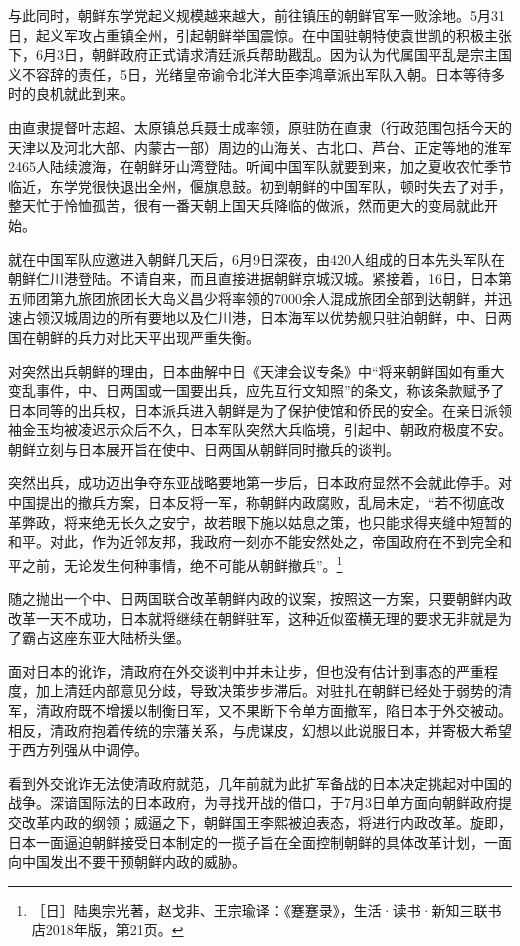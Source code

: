 \documentclass[12pt,UTF8]{ctexbook}
\begin{document}
与此同时，朝鲜东学党起义规模越来越大，前往镇压的朝鲜官军一败涂地。5月31日，起义军攻占重镇全州，引起朝鲜举国震惊。在中国驻朝特使袁世凯的积极主张下，6月3日，朝鲜政府正式请求清廷派兵帮助戡乱。因为认为代属国平乱是宗主国义不容辞的责任，5日，光绪皇帝谕令北洋大臣李鸿章派出军队入朝。日本等待多时的良机就此到来。

由直隶提督叶志超、太原镇总兵聂士成率领，原驻防在直隶（行政范围包括今天的天津以及河北大部、内蒙古一部）周边的山海关、古北口、芦台、正定等地的淮军2465人陆续渡海，在朝鲜牙山湾登陆。听闻中国军队就要到来，加之夏收农忙季节临近，东学党很快退出全州，偃旗息鼓。初到朝鲜的中国军队，顿时失去了对手，整天忙于怜恤孤苦，很有一番天朝上国天兵降临的做派，然而更大的变局就此开始。

就在中国军队应邀进入朝鲜几天后，6月9日深夜，由420人组成的日本先头军队在朝鲜仁川港登陆。不请自来，而且直接进据朝鲜京城汉城。紧接着，16日，日本第五师团第九旅团旅团长大岛义昌少将率领的7000余人混成旅团全部到达朝鲜，并迅速占领汉城周边的所有要地以及仁川港，日本海军以优势舰只驻泊朝鲜，中、日两国在朝鲜的兵力对比天平出现严重失衡。

对突然出兵朝鲜的理由，日本曲解中日《天津会议专条》中“将来朝鲜国如有重大变乱事件，中、日两国或一国要出兵，应先互行文知照”的条文，称该条款赋予了日本同等的出兵权，日本派兵进入朝鲜是为了保护使馆和侨民的安全。在亲日派领袖金玉均被凌迟示众后不久，日本军队突然大兵临境，引起中、朝政府极度不安。朝鲜立刻与日本展开旨在使中、日两国从朝鲜同时撤兵的谈判。

突然出兵，成功迈出争夺东亚战略要地第一步后，日本政府显然不会就此停手。对中国提出的撤兵方案，日本反将一军，称朝鲜内政腐败，乱局未定，“若不彻底改革弊政，将来绝无长久之安宁，故若眼下施以姑息之策，也只能求得夹缝中短暂的和平。对此，作为近邻友邦，我政府一刻亦不能安然处之，帝国政府在不到完全和平之前，无论发生何种事情，绝不可能从朝鲜撤兵”。\footnote{［日］陆奥宗光著，赵戈非、王宗瑜译：《蹇蹇录》，生活·读书·新知三联书店2018年版，第21页。}

随之抛出一个中、日两国联合改革朝鲜内政的议案，按照这一方案，只要朝鲜内政改革一天不成功，日本就将继续在朝鲜驻军，这种近似蛮横无理的要求无非就是为了霸占这座东亚大陆桥头堡。

面对日本的讹诈，清政府在外交谈判中并未让步，但也没有估计到事态的严重程度，加上清廷内部意见分歧，导致决策步步滞后。对驻扎在朝鲜已经处于弱势的清军，清政府既不增援以制衡日军，又不果断下令单方面撤军，陷日本于外交被动。相反，清政府抱着传统的宗藩关系，与虎谋皮，幻想以此说服日本，并寄极大希望于西方列强从中调停。

看到外交讹诈无法使清政府就范，几年前就为此扩军备战的日本决定挑起对中国的战争。深谙国际法的日本政府，为寻找开战的借口，于7月3日单方面向朝鲜政府提交改革内政的纲领；威逼之下，朝鲜国王李熙被迫表态，将进行内政改革。旋即，日本一面逼迫朝鲜接受日本制定的一揽子旨在全面控制朝鲜的具体改革计划，一面向中国发出不要干预朝鲜内政的威胁。
\end{document}
